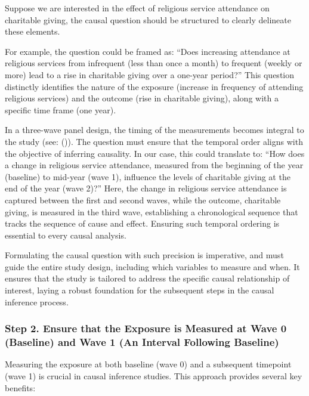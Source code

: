 \documentclass[
  singlecolumn,
  9pt]{article}
\begin{document}
Suppose we are interested in the effect of religious service attendance
on charitable giving, the causal question should be structured to
clearly delineate these elements.

For example, the question could be framed as: ``Does increasing
attendance at religious services from infrequent (less than once a
month) to frequent (weekly or more) lead to a rise in charitable giving
over a one-year period?'' This question distinctly identifies the nature
of the exposure (increase in frequency of attending religious services)
and the outcome (rise in charitable giving), along with a specific time
frame (one year).

In a three-wave panel design, the timing of the measurements becomes
integral to the study (see: ()). The question must ensure that the temporal order
aligns with the objective of inferring causality. In our case, this
could translate to: ``How does a change in religious service attendance,
measured from the beginning of the year (baseline) to mid-year (wave 1),
influence the levels of charitable giving at the end of the year (wave
2)?'' Here, the change in religious service attendance is captured
between the first and second waves, while the outcome, charitable
giving, is measured in the third wave, establishing a chronological
sequence that tracks the sequence of cause and effect. Ensuring such
temporal ordering is essential to every causal analysis.

Formulating the causal question with such precision is imperative, and
must guide the entire study design, including which variables to measure
and when. It ensures that the study is tailored to address the specific
causal relationship of interest, laying a robust foundation for the
subsequent steps in the causal inference process.

\subsubsection{Step 2. Ensure that the Exposure is Measured at Wave 0
(Baseline) and Wave 1 (An Interval Following
Baseline)}\label{step-2.-ensure-that-the-exposure-is-measured-at-wave-0-baseline-and-wave-1-an-interval-following-baseline}

Measuring the exposure at both baseline (wave 0) and a subsequent
timepoint (wave 1) is crucial in causal inference studies. This approach
provides several key benefits:
\end{document}
